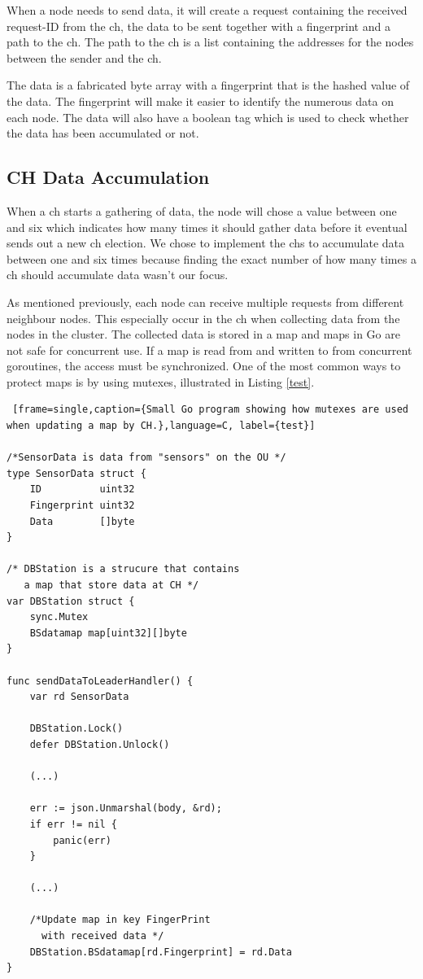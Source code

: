 \documentclass[USenglish]{uit-thesis}
\begin{document}
When a node needs to send data, it will create a request containing the received request-ID from the \gls{ch}, the data to be sent together with a fingerprint and a path to the \gls{ch}. The path to the \gls{ch} is a list containing the addresses for the nodes between the sender and the \gls{ch}.


The data is a fabricated byte array with a fingerprint that is the hashed value of the data. The fingerprint will make it easier to identify the numerous data on each node. The data will also have a boolean tag which is used to check whether the data has been accumulated or not. 


\subsection{CH Data Accumulation}
When a \gls{ch} starts a gathering of data, the node will chose a value between one and six which indicates how many times it should gather data before it eventual sends out a new \gls{ch} election. We chose to implement the \gls{ch}s to accumulate data between one and six times because finding the exact number of how many times a \gls{ch} should accumulate data wasn't our focus.



As mentioned previously, each node can receive multiple requests from different neighbour nodes.
This especially occur in the \gls{ch} when collecting data from the nodes in the cluster. The collected data is stored in a map and maps in Go are not safe for concurrent use. If a map is read from and written to from concurrent goroutines, the access must be synchronized. One of the most common ways to protect maps is by using mutexes, illustrated in Listing \ref{test}.


\begin{lstlisting} [frame=single,caption={Small Go program showing how mutexes are used when updating a map by CH.},language=C, label={test}]

/*SensorData is data from "sensors" on the OU */
type SensorData struct {
	ID          uint32
	Fingerprint uint32
	Data        []byte
}

/* DBStation is a strucure that contains 
   a map that store data at CH */
var DBStation struct {
	sync.Mutex
	BSdatamap map[uint32][]byte
}

func sendDataToLeaderHandler() {
	var rd SensorData
	
	DBStation.Lock()
	defer DBStation.Unlock()
	
	(...)
	
	err := json.Unmarshal(body, &rd); 
	if err != nil {
		panic(err)
	}
	
	(...)
	
	/*Update map in key FingerPrint
	  with received data */
	DBStation.BSdatamap[rd.Fingerprint] = rd.Data
}
\end{lstlisting}
\end{document}
